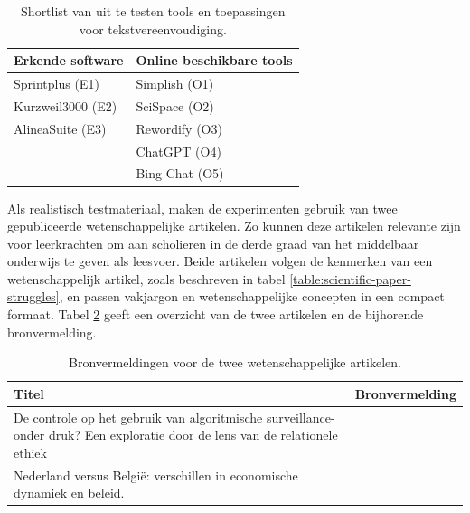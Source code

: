 \begin{center}
	\begin{table}[H]
		\begin{tabular}{ | m{6cm} | m{6cm} | } 
			\hline
			\textbf{Erkende software} & \textbf{Online beschikbare tools} \\
			\hline
			Sprintplus (E1) & Simplish (O1) \\
			Kurzweil3000 (E2) & SciSpace (O2) \\ 
			AlineaSuite (E3) & Rewordify (O3) \\
			& ChatGPT (O4) \\
			& Bing Chat (O5) \\
			\hline
		\end{tabular}
		\caption{Shortlist van uit te testen tools en toepassingen voor tekstvereenvoudiging.}
		\label{table:shortlist-tools}	
	\end{table}
\end{center}

Als realistisch testmateriaal, maken de experimenten gebruik van twee gepubliceerde wetenschappelijke artikelen. Zo kunnen deze artikelen relevante zijn voor leerkrachten om aan scholieren in de derde graad van het middelbaar onderwijs te geven als leesvoer. Beide artikelen volgen de kenmerken van een wetenschappelijk artikel, zoals beschreven in tabel \ref{table:scientific-paper-struggles}, en passen vakjargon en wetenschappelijke concepten in een compact formaat. Tabel \ref{table:referentieteksten-bronvermelding} geeft een overzicht van de twee artikelen en de bijhorende bronvermelding.

\begin{center}
	\begin{table}[H]
		\begin{tabular}{ | m{10cm} | m{5cm} | } 
			\hline
			\textbf{Titel} & \textbf{Bronvermelding} \\
			\hline
			De controle op het gebruik van algoritmische surveillance- onder druk? Een exploratie door de lens van de relationele ethiek & \autocite{VanBrakel2022} \\
			\hline
			Nederland versus België: verschillen in economische dynamiek en beleid. & \autocite{Sleuwaegen2022} \\
			\hline
		\end{tabular}
		\caption{Bronvermeldingen voor de twee wetenschappelijke artikelen.}
		\label{table:referentieteksten-bronvermelding}
	\end{table}
\end{center}

